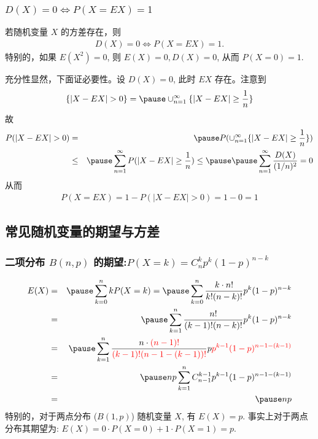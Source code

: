 	\begin{frame}
		\frametitle{$D(X)=0\Leftrightarrow P(X=EX)=1$}
		\begin{thm}\label{sec:var0}
			若随机变量 $X$ 的方差存在，则
			\begin{eqnarray*}
				D(X)=0\Leftrightarrow P(X=EX)=1.
			\end{eqnarray*}
			特别的，如果 $E (X^2)=0$, 则 $E (X)=0,D (X)=0$, 从而 $P (X=0)=1$.
		\end{thm}

		\pause \zheng 充分性显然，下面证必要性。设 $D (X)=0$, 此时 $EX$ 存在。注意到
		\begin{eqnarray*}
			\{|X-EX|>0\}=\pause \cup_{n=1}^\infty \{|X-EX|\ge \dfrac{1}{n}\}
		\end{eqnarray*}
		\pause 故
		\begin{eqnarray*}
			P(|X-EX|>0)&=&\pause P(\cup_{n=1}^\infty \{|X-EX|\ge \dfrac{1}{n}\})\\
			&\le &\pause \sum_{n=1}^{\infty}P(|X-EX|\ge \dfrac{1}{n})\le\pause \pause \sum_{n=1}^{\infty}\dfrac{D(X)}{(1/n)^2}=0
		\end{eqnarray*}
		\pause 从而
		\begin{eqnarray*}
			P(X=EX)=1-P(|X-EX|>0)=1-0=1
		\end{eqnarray*}



	\end{frame}




	\subsection{常见随机变量的期望与方差}
	\begin{frame}
		\frametitle{二项分布 $B (n,p)$ 的期望:$P (X=k)=C_n^kp^k (1-p)^{n-k}$}
			\begin{eqnarray*}
				E(X)&=&\pause \sum_{k=0}^nkP(X=k)=\pause \sum_{k=0}^n\dfrac{k\cdot n!}{k!(n-k)!}p^k(1-p)^{n-k}\\
				&=&\pause \sum_{k=1}^{n}\dfrac{n!}{(k-1)!(n-k)!}p^k(1-p)^{n-k}\\
				&=&\pause \sum_{k=1}^{n}\dfrac{n\cdot \textcolor{red}{(n-1)!}}{\textcolor{red}{(k-1)!(n-1-(k-1))!}}p \textcolor{red}{p^{k-1}(1-p)^{n-1-(k-1)}}\\
				&=&\pause np\sum_{k=1}^nC_{n-1}^{k-1}p^{k-1}(1-p)^{n-1-(k-1)}\\
				&=&\pause np
			\end{eqnarray*}
			\pause 特别的，对于两点分布 ($B (1,p)$) 随机变量 $X$, 有 $E (X)=p$. \pause 事实上对于两点分布其期望为: $E (X)=0\cdot P (X=0)+1\cdot P (X=1)=p$.
	\end{frame}

